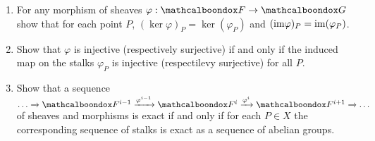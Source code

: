 \begin{ex}
	\begin{enumerate}[label=\alph*)]
		\item For any morphism of sheaves $\varphi: \sF \to \sG$ show that for each point $P$, $(\ker \varphi)_P = \ker(\varphi_P)$ and $(\mathrm{im} \varphi)_P = \mathrm{im} (\varphi_P)$.
		\item Show that $\varphi$ is injective (respectively surjective) if and only if the induced map on the stalks $\varphi_P$ is injective (respectilevy surjective) for all $P$.
		\item Show that a sequence $\dots \xrightarrow[]{} \sF^{i-1} \xrightarrow[]{\varphi^{i-1}} \sF^{i} \xrightarrow[]{\varphi^{i}} \sF^{i+1} \xrightarrow[]{} \dots$ of sheaves and morphisms is exact if and only if for each $P \in X$ the corresponding sequence of stalks is exact as a sequence of abelian groups.
	\end{enumerate}
\end{ex}

